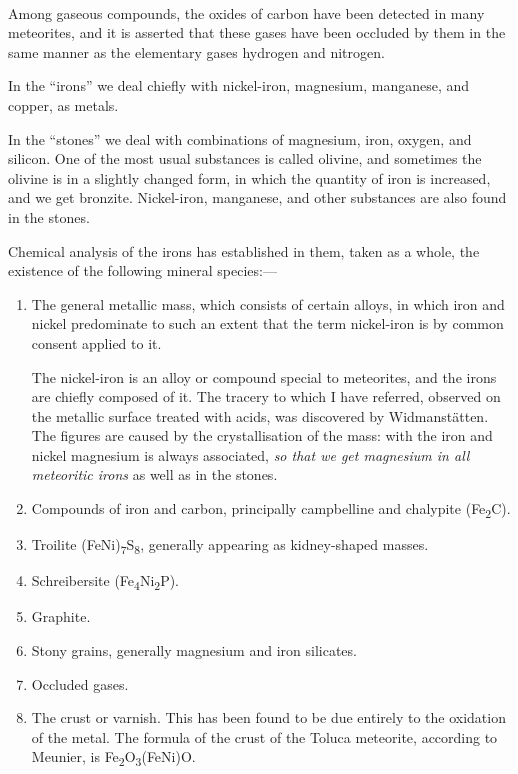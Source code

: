 \documentclass[a4paper, 12pt, oneside, polutonikogreek, english]{article}
\begin{document}
\paragraph{}
Among gaseous compounds, the oxides of carbon have been detected in many meteorites, and it is asserted that these gases have been occluded by them in the same manner as the elementary gases hydrogen and nitrogen.

In the ``irons'' we deal chiefly with nickel-iron, magnesium, manganese, and copper, as metals.

In the ``stones'' we deal with combinations of magnesium, iron, oxygen, and silicon. One of the most usual substances is called olivine, and sometimes the olivine is in a slightly changed form, in which the quantity of iron is increased, and we get bronzite. Nickel-iron, manganese, and other substances are also found in the stones.

Chemical analysis of the irons has established in them, taken as a whole, the existence of the following mineral species:---
\begin{enumerate}
    \item The general metallic mass, which consists of certain alloys, in which iron and nickel predominate to such an extent that the term nickel-iron is by common consent applied to it.
    
    \hspace*{5mm}The nickel-iron is an alloy or compound special to meteorites, and the irons are chiefly composed of it. The tracery to which I have referred, observed on the metallic surface treated with acids, was discovered by Widmanstätten. The figures are caused by the crystallisation of the mass: with the iron and nickel magnesium is always associated, \emph{so that we get magnesium in all meteoritic irons} as well as in the stones.
    
    \item Compounds of iron and carbon, principally campbelline and chalypite (Fe\textsubscript{2}C).
    
    \item Troilite (FeNi)\textsubscript{7}S\textsubscript{8}, generally appearing as kidney-shaped masses.

    \item Schreibersite (Fe\textsubscript{4}Ni\textsubscript{2}P).

    \item Graphite.

    \item Stony grains, generally magnesium and iron silicates.

    \item Occluded gases.

    \item The crust or varnish. This has been found to be due entirely to the oxidation of the metal. The formula of the crust of the Toluca meteorite, according to Meunier, is Fe\textsubscript{2}O\textsubscript{3}(FeNi)O.
\end{enumerate}
\end{document}
